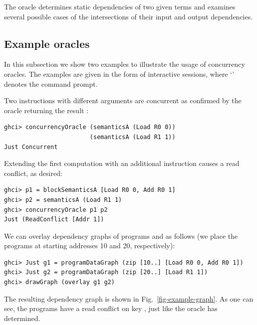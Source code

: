 The oracle determines static dependencies of two given terms and examines
several possible cases of the intersections of their input and output
dependencies.

\subsection{Example oracles}

In this subsection we show two examples to illustrate the usage of concurrency
oracles. The examples are given in the form of interactive sessions, where
`' denotes the command prompt.

Two  instructions with different arguments are concurrent as confirmed
by the oracle returning the result :

\begin{verbatim}
ghci> concurrencyOracle (semanticsA (Load R0 0))
                        (semanticsA (Load R1 1))
Just Concurrent
\end{verbatim}

\noindent
Extending the first computation with an additional  instruction causes
a read conflict, as desired:
\begin{verbatim}
ghci> p1 = blockSemanticsA [Load R0 0, Add R0 1]
ghci> p2 = semanticsA (Load R1 1)
ghci> concurrencyOracle p1 p2
Just (ReadConflict [Addr 1])
\end{verbatim}

\noindent
We can overlay dependency graphs of programs  and  as follows (we
place the programs at starting addresses 10 and 20, respectively):

\begin{verbatim}
ghci> Just g1 = programDataGraph (zip [10..] [Load R0 0, Add R0 1])
ghci> Just g2 = programDataGraph (zip [20..] [Load R1 1])
ghci> drawGraph (overlay g1 g2)
\end{verbatim}

\noindent
The resulting dependency graph is shown in Fig.~\ref{fig-example-graph}.
As one can see, the programs have a read conflict on key ,
just like the oracle has determined.


